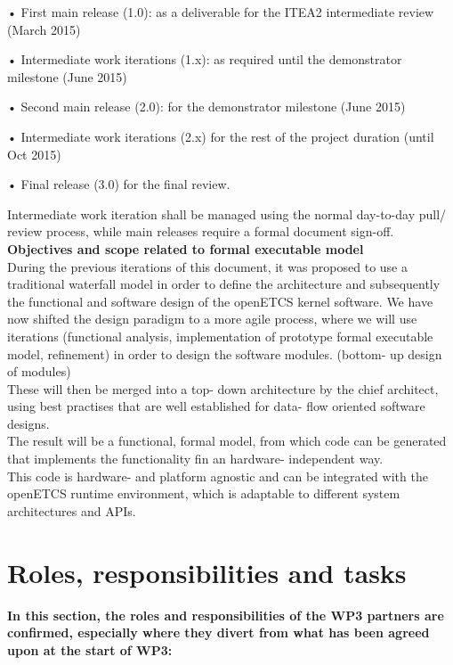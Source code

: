• First main release (1.0): as a deliverable for the ITEA2 intermediate review (March 2015)

• Intermediate work iterations (1.x): as required until the demonstrator milestone (June 2015)

•  Second main release (2.0): for the demonstrator milestone (June 2015)

•  Intermediate work iterations (2.x) for the rest of the project duration (until Oct 2015)

•  Final release (3.0) for the final review.

Intermediate work iteration shall be managed using the normal day-to-day pull/ review process, while main releases require a formal document sign-off.\\


\textbf{Objectives and scope related to formal executable model}\\

During the previous iterations of this document, it was proposed to use a traditional waterfall model in order to define the architecture and subsequently the functional and software design of the openETCS kernel software.
We have now shifted the design paradigm to a more agile process, where we will use iterations (functional analysis, implementation of prototype formal executable model, refinement) in order to design the software modules. (bottom- up design of modules)\\
These will then be merged into a top- down architecture by the chief architect, using best practises that are well established for data- flow oriented software designs.\\

The result will be a functional, formal model, from which code can be generated that implements the functionality fin an hardware- independent way.\\
This code is hardware- and platform agnostic and can be integrated with the openETCS runtime environment, which is adaptable to different system architectures and APIs.\\



\section{Roles, responsibilities and tasks}
\textbf{In this section, the roles and responsibilities of the WP3 partners are confirmed, especially where they divert from what has been agreed upon at the start of WP3:}

